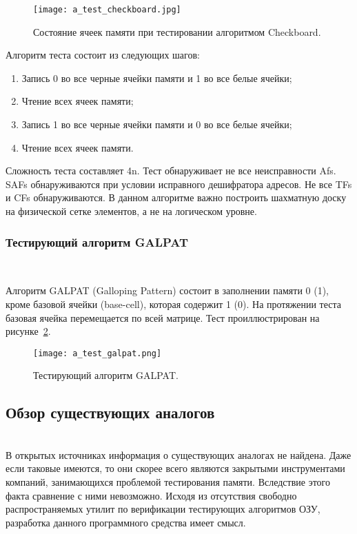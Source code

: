 \begin{figure}[ht]
\centering
  \texttt{[image: a\_test\_checkboard.jpg]}  
  \caption{ Состояние ячеек памяти при тестировании алгоритмом Checkboard. }
  \label{fig:domain:tests:checkboard}
\end{figure}

Алгоритм теста состоит из следующих шагов:
\begin{enumerate}
\item Запись 0 во все черные ячейки памяти и 1 во все белые ячейки;
\item Чтение всех ячеек памяти;
\item Запись 1 во все черные ячейки памяти и 0 во все белые ячейки;
\item Чтение всех ячеек памяти.
\end{enumerate}

Сложность теста составляет 4n. Тест обнаруживает не все неисправности Afs. SAFs обнаруживаются при условии исправного дешифратора адресов. Не все TFs и CFs обнаруживаются. В данном алгоритме важно построить шахматную доску на физической сетке элементов, а не на логическом уровне.

\subsubsection{Тестирующий алгоритм GALPAT}~\\
\label{page:domain:tests:checkboard}

Алгоритм GALPAT (Galloping Pattern) состоит в заполнении памяти 0 (1), кроме базовой ячейки (base-cell), которая содержит 1 (0). На протяжении теста базовая ячейка перемещается по всей матрице. Тест проиллюстрирован на рисунке~\ref{fig:domain:tests:galpat}.

\begin{figure}[ht]
\centering
  \texttt{[image: a\_test\_galpat.png]}  
  \caption{ Тестирующий алгоритм GALPAT. }
  \label{fig:domain:tests:galpat}
\end{figure}



\subsection{Обзор существующих аналогов}~\\
\label{page:domain:analogue}
В открытых источниках информация о существующих аналогах не найдена. Даже если таковые имеются, то они скорее всего являются закрытыми инструментами компаний, занимающихся проблемой тестирования памяти. Вследствие этого факта сравнение с ними невозможно. Исходя из отсутствия свободно распространяемых утилит по верификации тестирующих алгоритмов ОЗУ, разработка данного
программного средства имеет смысл.

